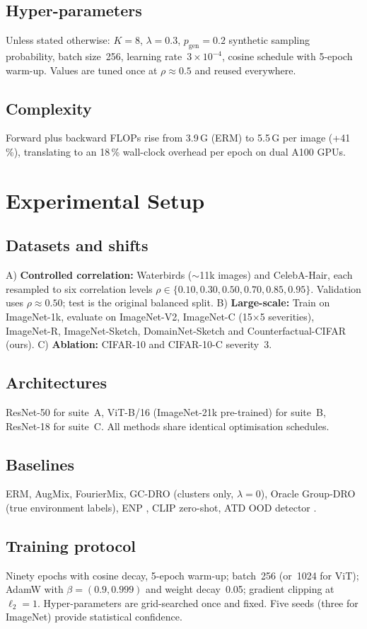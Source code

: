 \documentclass{article}
\begin{document}
\subsection{Hyper-parameters}
Unless stated otherwise: $K = 8$, $\lambda = 0.3$, $p_{\text{gen}} = 0.2$ synthetic sampling probability, batch size~256, learning rate~$3\times10^{-4}$, cosine schedule with 5-epoch warm-up. Values are tuned once at $\rho \approx 0.5$ and reused everywhere.

\subsection{Complexity}
Forward plus backward FLOPs rise from 3.9\,G (ERM) to 5.5\,G per image (+41\,\%), translating to an 18\,\% wall-clock overhead per epoch on dual A100 GPUs.

\section{Experimental Setup}
\subsection{Datasets and shifts}
A) \textbf{Controlled correlation:} Waterbirds (\(\sim\)11k images) and CelebA-Hair, each resampled to six correlation levels $\rho \in \{0.10, 0.30, 0.50, 0.70, 0.85, 0.95\}$. Validation uses $\rho \approx 0.50$; test is the original balanced split. B) \textbf{Large-scale:} Train on ImageNet-1k, evaluate on ImageNet-V2, ImageNet-C (15$\times$5 severities), ImageNet-R, ImageNet-Sketch, DomainNet-Sketch and Counterfactual-CIFAR (ours). C) \textbf{Ablation:} CIFAR-10 and CIFAR-10-C severity~3.

\subsection{Architectures}
ResNet-50 for suite~A, ViT-B/16 (ImageNet-21k pre-trained) for suite~B, ResNet-18 for suite~C. All methods share identical optimisation schedules.

\subsection{Baselines}
ERM, AugMix, FourierMix, GC-DRO (clusters only, $\lambda = 0$), Oracle Group-DRO (true environment labels), ENP \cite{ghosal-2023-contextual}, CLIP zero-shot, ATD OOD detector \cite{azizmalayeri-2022-your}.

\subsection{Training protocol}
Ninety epochs with cosine decay, 5-epoch warm-up; batch~256 (or~1024 for ViT); AdamW with $\beta=(0.9,0.999)$ and weight decay~0.05; gradient clipping at $\ell_2=1$. Hyper-parameters are grid-searched once and fixed. Five seeds (three for ImageNet) provide statistical confidence.
\end{document}
